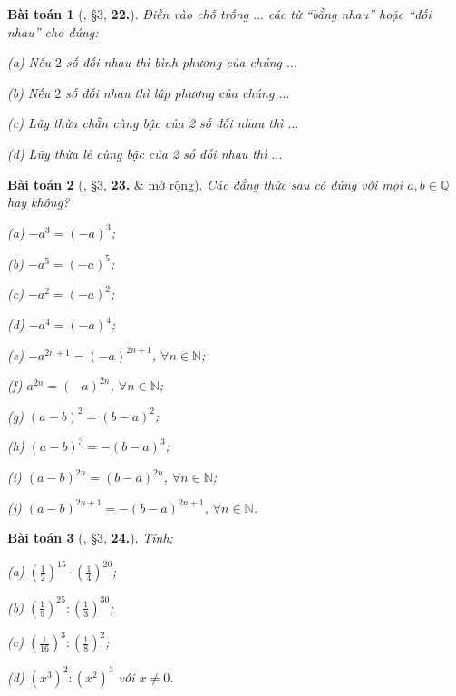 \documentclass{article}
\numberwithin{equation}{section}
\newtheorem{baitoan}{Bài toán}[section]
\begin{document}
\begin{baitoan}[\cite{Binh_Toan_7_tap_1}, \S3, \textbf{22.}]
	Điền vào chỗ trống $\ldots$ các từ ``bằng nhau'' hoặc ``đối nhau'' cho đúng:
	\begin{enumerate*}
		\item[(a)] Nếu $2$ số đối nhau thì bình phương của chúng $\ldots$
		\item[(b)] Nếu $2$ số đối nhau thì lập phương của chúng $\ldots$
		\item[(c)] Lũy thừa chẵn cùng bậc của 2 số đối nhau thì $\ldots$
		\item[(d)] Lũy thừa lẻ cùng bậc của 2 số đối nhau thì $\ldots$
	\end{enumerate*}
\end{baitoan}

\begin{baitoan}[\cite{Binh_Toan_7_tap_1}, \S3, \textbf{23.} \& mở rộng]
	Các đẳng thức sau có đúng với mọi $a,b\in\mathbb{Q}$ hay không?
	\begin{enumerate*}
		\item[(a)] $-a^3 = (-a)^3$;
		\item[(b)] $-a^5 = (-a)^5$;
		\item[(c)] $-a^2 = (-a)^2$;
		\item[(d)] $-a^4 = (-a)^4$;
		\item[(e)] $-a^{2n+1} = (-a)^{2n+1}$, $\forall n\in\mathbb{N}$;
		\item[(f)] $a^{2n} = (-a)^{2n}$, $\forall n\in\mathbb{N}$;
		\item[(g)] $(a - b)^2 = (b - a)^2$;
		\item[(h)] $(a - b)^3 = -(b - a)^3$;
		\item[(i)] $(a - b)^{2n} = (b - a)^{2n}$, $\forall n\in\mathbb{N}$;
		\item[(j)] $(a - b)^{2n+1} = -(b - a)^{2n+1}$, $\forall n\in\mathbb{N}$.
	\end{enumerate*}
\end{baitoan}

\begin{baitoan}[\cite{Binh_Toan_7_tap_1}, \S3, \textbf{24.}]
	Tính:
	\begin{enumerate*}
		\item[(a)] $\left(\frac{1}{2}\right)^{15}\cdot\left(\frac{1}{4}\right)^{20}$;
		\item[(b)] $\left(\frac{1}{9}\right)^{25}:\left(\frac{1}{3}\right)^{30}$;
		\item[(c)] $\left(\frac{1}{16}\right)^3:\left(\frac{1}{8}\right)^2$;
		\item[(d)] $(x^3)^2:(x^2)^3$ với $x\ne 0$.
	\end{enumerate*}
\end{baitoan}
\end{document}
